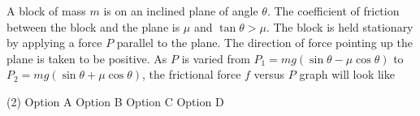 
\item A block of mass $m$ is on an inclined plane of angle $\theta$. The coefficient of friction between the block and the plane is $\mu$ and $\tan{\theta} > \mu$. The block is held stationary by applying a force $P$ parallel to the plane. The direction of force pointing up the plane is taken to be positive. As $P$ is varied from $P_1 = mg(\sin{\theta} - \mu \cos{\theta})$ to $P_2 = mg(\sin{\theta} + \mu \cos{\theta})$, the frictional force $f$ versus $P$ graph will look like
\begin{center}
\end{center}
\begin{tasks}(2)
    \task Option A
    \task Option B
    \task Option C
    \task Option D
\end{tasks}
